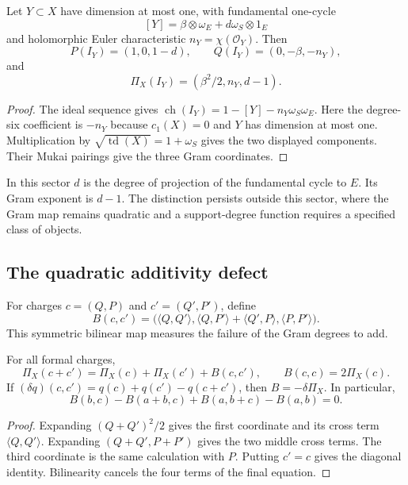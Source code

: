 \begin{proposition}
\label{k3:prop:ideal-charge}
Let $Y\subset X$ have dimension at most one, with fundamental
one-cycle
\[
[Y]=\beta\otimes\omega_E+d\omega_S\otimes1_E
\]
and holomorphic Euler characteristic $n_Y=\chi(\mathcal O_Y)$.
Then
\[
P(I_Y)=(1,0,1-d),\qquad Q(I_Y)=(0,-\beta,-n_Y),
\]
and
\[
\Pi_X(I_Y)=(\beta^2/2,n_Y,d-1).
\]
\end{proposition}

\begin{proof}
The ideal sequence gives
$\operatorname{ch}(I_Y)=1-[Y]-n_Y\omega_S\omega_E$.
Here the degree-six coefficient is $-n_Y$ because $c_1(X)=0$ and
$Y$ has dimension at most one.  Multiplication by
$\sqrt{\operatorname{td}(X)}=1+\omega_S$ gives the two displayed
components.  Their Mukai pairings give the three Gram coordinates.
\end{proof}

In this sector $d$ is the degree of projection of the fundamental
cycle to $E$.  Its Gram exponent is $d-1$.  The distinction persists
outside this sector, where the Gram map remains quadratic and a
support-degree function requires a specified class of objects.

\subsection{The quadratic additivity defect}
\label{subsec:gram-map-bilinear-cocycle}

For charges $c=(Q,P)$ and $c'=(Q',P')$, define
\[
B(c,c')=\bigl(\langle Q,Q'\rangle,
\langle Q,P'\rangle+\langle Q',P\rangle,
\langle P,P'\rangle\bigr).
\]
This symmetric bilinear map measures the failure of the Gram degrees
to add.

\begin{lemma}[Polarization]
\label{lem:gram-additivity-defect}
\label{lem:b-cocycle-identity}
For all formal charges,
\[
\Pi_X(c+c')=\Pi_X(c)+\Pi_X(c')+B(c,c'),
\qquad B(c,c)=2\Pi_X(c).
\]
If $(\delta q)(c,c')=q(c)+q(c')-q(c+c')$, then $B=-\delta\Pi_X$.
In particular,
\[
B(b,c)-B(a+b,c)+B(a,b+c)-B(a,b)=0.
\]
\end{lemma}

\begin{proof}
Expanding $(Q+Q')^2/2$ gives the first coordinate and its cross term
$\langle Q,Q'\rangle$.  Expanding $(Q+Q',P+P')$ gives the two middle
cross terms.  The third coordinate is the same calculation with $P$.
Putting $c'=c$ gives the diagonal identity.  Bilinearity cancels the
four terms of the final equation.
\end{proof}

